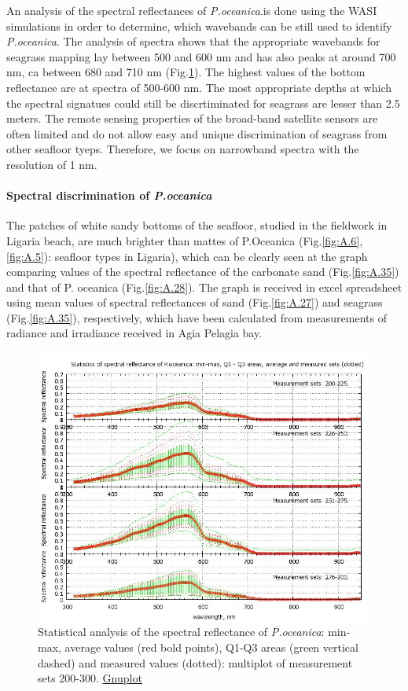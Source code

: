 \documentclass[10pt, a4paper]{article}
\begin{document}
An analysis of the spectral reflectances of \textit{P.oceanica}.is done using the WASI simulations in order to
determine, which wavebands can be still used to identify \textit{P.oceanica}. The analysis of spectra shows
that the appropriate wavebands for seagrass mapping lay between 500 and 600 nm and has
also peaks at around 700 nm, ca between 680 and 710 nm (Fig.\ref{fig:4.10}). The highest values of the bottom
reflectance are at spectra of 500-600 nm. The most appropriate depths at which the spectral signatues
could still be discrtiminated for seagrass are lesser than 2.5 meters.
The remote sensing properties of the broad-band satellite sensors are often limited and do not allow
easy and unique discrimination of seagrass from other seafloor tyeps. Therefore, we focus on narrowband
spectra with the resolution of 1 nm.

\paragraph{Spectral discrimination of \textit{P.oceanica}}
The patches of white sandy bottoms of the seafloor, studied in the fieldwork in Ligaria beach, are
much brighter than mattes of P.Oceanica (Fig.\ref{fig:A.6}, \ref{fig:A.5}): seafloor types in Ligaria), which can be clearly seen
at the graph comparing values of the spectral reflectance of the carbonate sand (Fig.\ref{fig:A.35}) and that of P.
oceanica (Fig.\ref{fig:A.28}).
The graph is received in excel spreadsheet using mean values of spectral reflectances of
sand (Fig.\ref{fig:A.27}) and seagrass (Fig.\ref{fig:A.35}), respectively, which have been calculated from measurements of radiance and
irradiance received in Agia Pelagia bay.

\begin{figure}[h]
	\centering
	\includegraphics[scale=0.40]{GNU-19.jpg}
	\caption{Statistical analysis of the spectral reflectance of \textit{P.oceanica}: min-max, average values (red bold points), Q1-Q3 areas (green vertical dashed) and 			measured values (dotted): multiplot of measurement sets 200-300. \href{http://www.gnuplot.info/}{Gnuplot}}
	\label{fig:4.10}
\end{figure}
\end{document}
